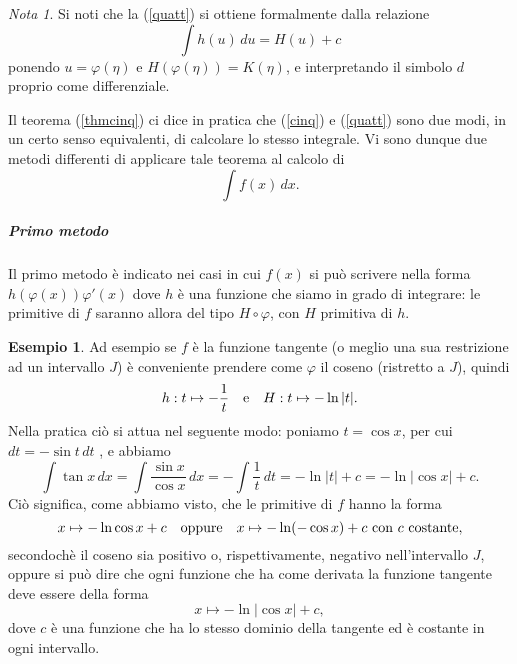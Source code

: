 \documentclass{article}
\theoremstyle{plain}
\theoremstyle{definition}
\newtheorem{exmp}{Esempio}[section]
\theoremstyle{remark}
\newtheorem{note}{Nota}
\begin{document}
\vspace{10pt}

\begin{note}
    Si noti che la (\ref{quatt}) si ottiene formalmente dalla relazione 
    \begin{equation}
    \int h(u)\,du=H(u)+c \label{cinq}
    \end{equation}
    ponendo $u=\varphi(\eta)$ e $H(\varphi(\eta))=K(\eta)$, e interpretando il simbolo $d$ proprio come differenziale.
\end{note}

\vspace{10pt}

Il teorema (\ref{thmcinq}) ci dice in pratica che (\ref{cinq}) e (\ref{quatt}) sono due modi, in un certo senso equivalenti, di calcolare lo stesso integrale.
Vi sono dunque due metodi differenti di applicare tale teorema al calcolo di \[\int f(x)\,dx.\]

\vspace{10pt}

\subparagraph{Primo metodo}
Il primo metodo è indicato nei casi in cui $f(x)$ si può scrivere nella forma $h(\varphi(x))\varphi'(x)$ dove $h$ è una funzione che siamo in grado di integrare: le primitive di $f$ saranno allora del tipo $H\circ\varphi$, con $H$ primitiva di $h$.

\vspace{10pt}

\begin{exmp}
    Ad esempio se $f$ è la funzione tangente (o meglio una sua restrizione ad un intervallo $J$) è conveniente prendere come $\varphi$ il coseno (ristretto a $J$), quindi \[h:t\mapsto-\dfrac{1}{t}\quad\textup{e}\quad H:t\mapsto -\ln|t|.\] Nella pratica
    ciò si attua nel seguente modo: poniamo $t=\cos x$, per cui $dt=-\sin t\,dt$ , e abbiamo
    \[\int\tan x\,dx=\int\dfrac{\sin x}{\cos x}\,dx=-\int\dfrac{1}{t}\,dt=-\ln|t|+c=-\ln|\cos x|+c.\]
    Ciò significa, come abbiamo visto, che le primitive di $f$ hanno la forma 
    \[x\mapsto -\ln\cos x+c\quad\textup{oppure}\quad x\mapsto-\ln(-\cos x)+c\textup{ con }c\textup{ costante},\] 
    secondochè il coseno sia positivo o, rispettivamente, negativo nell'intervallo $J$, oppure si può dire che 
    ogni funzione che ha come derivata la funzione tangente deve essere della forma \[x\mapsto -\ln|\cos x|+c,\] dove $c$ è una funzione che ha lo stesso dominio della tangente ed è costante in ogni intervallo.
\end{exmp}

\vspace{10pt}
\end{document}
